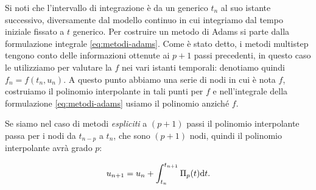 Si noti che l'intervallo di integrazione è da un generico $t_{n} $ al suo istante successivo, diversamente dal modello continuo in cui integriamo dal tempo iniziale fissato a $t$ generico.
Per costruire un metodo di Adams si parte dalla formulazione integrale \eqref{eq:metodi-adams}. Come è stato detto, i metodi multistep tengono conto delle informazioni ottenute ai $p+1$ passi precedenti, in questo caso le utilizziamo per valutare la $f$ nei vari istanti temporali: denotiamo quindi $f_{n}=f(t_{n},u_{n})$.
A questo punto abbiamo una serie di nodi in cui è nota $f$, costruiamo il polinomio interpolante in tali punti per $f$ e nell'integrale della formulazione \eqref{eq:metodi-adams} usiamo il polinomio anziché $f$.

Se siamo nel caso di metodi \textit{espliciti} a $(p+1)$ passi il polinomio interpolante passa per i nodi da $t_{n-p} $ a $t_{n} $, che sono $(p+1)$ nodi, quindi il polinomio interpolante avrà grado $p$:

\begin{equation*}
u_{n+1} =u_{n} +\int\nolimits ^{t_{n+1}}_{t_{n}} \Pi _{p}(t) \mathrm d t.
\end{equation*}


